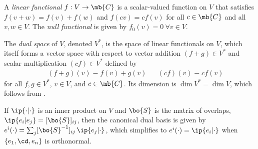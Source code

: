 \documentclass[11pt,fleqn]{article}
\numberwithin{equation}{section}
\begin{document}
\begin{dfn}
A \textit{linear functional} $f:V\rightarrow\mb{C}$ is a scalar-valued function on $V$ that satisfies $f(v+w)=f(v)+f(w)$ and $f(cv)=cf(v)$ for all $c\in\mb{C}$ and all $v,w\in V$.
The \textit{null functional} is given by $f_0(v)=0\ \forall v\in V$.
\end{dfn}

\begin{dfn}
The \textit{dual space} of $V$, denoted $V^*$, is the space of linear functionals on $V$, which itself forms a vector space with respect to vector addition $(f+g)\in V^*$ and scalar multiplication $(cf)\in V^*$ defined by
\begin{align}
&&
  (f+g)(v)
\equiv
  f(v) + g(v)
&&
  (cf)(v)
\equiv
  cf(v)
\end{align}
for all $f,g\in V^*$, $v\in V$, and $c\in\mb{C}$.
Its dimension is $\dim V^*=\dim V$, which follows from .
\end{dfn}

\begin{prop}\label{canonical-dual-basis}
\end{prop}

\begin{rmk}
If $\ip{\cdot|\cdot}$ is an inner product on $V$ and $\bo{S}$ is the matrix of overlaps, $\ip{e_i|e_j}=[\bo{S}]_{ij}$, then the canonical dual basis is given by $e^i(\cdot)=\sum_j[\bo{S}^{-1}]_{ij}\,\ip{e_j|\cdot}$, which simplifies to $e^i(\cdot)=\ip{e_i|\cdot}$ when $\{e_1,\cd,e_n\}$ is orthonormal.
\end{rmk}
\end{document}
